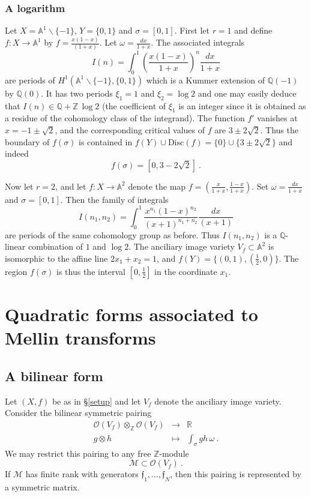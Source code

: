 \documentclass[a4paper,10pt]{amsart}
\theoremstyle{definition}
\theoremstyle{remark}
\numberwithin{equation}{section}
\newcommand{\To}{\longrightarrow}
\newcommand{\Z}{\mathbb Z}
\newcommand{\Q}{\mathbb Q}
\newcommand{\R}{\mathbb R}
\newcommand{\Or}{\mathcal{O}}
\newcommand{\ff}{\mathfrak{f}}
\newcommand{\0}{\color{blue}{\mathsf{0}}}
\begin{document}
\subsubsection{A logarithm} Let   $X= \mathbb{A}^1 \backslash \{-1\}$, $Y=\{0,1\}$ and $\sigma = [0,1]$. 
First  let $r=1$ and define $f: X \rightarrow \mathbb{A}^1$ by 
$f=\frac{x(1-x)}{(1+x)}$. Let $\omega = \frac{dx}{1+x}$. The associated integrals  
\[  I(n) =  \int_{0}^1  \left(\frac{x(1-x)}{1+x}\right)^n \frac{dx}{1+x}\]
are periods of $H^1(\mathbb{A}^1\backslash \{-1\}, \{0,1\})$ which is a  Kummer extension of $\Q(-1)$ by $\Q(0)$. It has two periods $\xi_1=1$ and $\xi_2= \log 2$ and one may easily deduce that $I(n) \in \Q + \Z \,\log 2$ (the coefficient of $\xi_1$ is an integer since it is obtained as  a  residue of the cohomology class of the integrand). 
The function $f'$ vanishes at $x = -1 \pm \sqrt{2}$, and the corresponding critical values of $f$ are $3 \pm 2 \sqrt{2}$.  Thus the boundary of $f (\sigma)$ is contained in $f(Y) \cup \mathrm{Disc}(f) = \{0\} \cup \{ 3 \pm 2 \sqrt{2}\}$ and indeed 
\[ f(\sigma) =  [ 0, 3- 2 \sqrt{2}]\ .\]





Now let $r=2$,    and  let $f: X \rightarrow \mathbb{A}^2$ denote the map $f=(\frac{x}{1+x},\frac{1-x}{1+x})$.
Set $\omega = \frac{dx}{1+x}$ and $\sigma = [0,1]$. Then 
the family of integrals 
\[  I(n_1,n_2) =  \int_{0}^1   \frac{x^{n_1} (1-x)^{n_2} }{(x+1)^{n_1+n_2}} \frac{dx}{(x+1) }\]
are periods of the same cohomology group as before. 
Thus  $I(n_1,n_2) $ is a $\Q$-linear combination of $1$ and $\log 2$.
The anciliary image variety  $V_f  \subset \mathbb{A}^2$ is  isomorphic to the affine line $2x_1 + x_2 =1$, and $f(Y)= \{ (0,1),  (\frac{1}{2},0)\}$. The region $f(\sigma)$ is thus the interval $[0,\frac{1}{2}]$ in the coordinate $x_1$. 

 
 
 
 \section{Quadratic forms associated to Mellin transforms } \label{sect: QuadraticformsMellin} 







\subsection{A bilinear form} Let $(X,f)$ be as in \S\ref{setup} and let $V_f$ denote the anciliary image variety. 
 Consider the  bilinear symmetric pairing
\begin{eqnarray} \label{bilinear}
\Or(V_f) \otimes_{\Z} \Or(V_f) & \To & \R    \\
g \otimes h & \mapsto &  \int_{\sigma} gh \, \omega \ . \nonumber 
\end{eqnarray} 
We may restrict this pairing to any free $\Z$-module
\[ \mathcal{M}  \subset  \Or(V_f)\ . \] 
If $\mathcal{M}$ has finite rank with  generators  $\ff_1,\ldots, \ff_N$, then this pairing is represented by a symmetric matrix.
\end{document}
